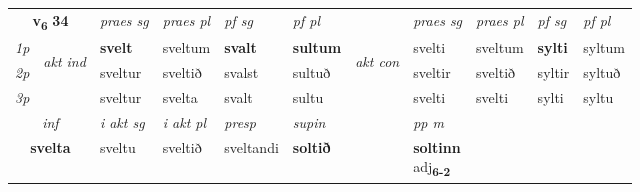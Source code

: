 \noindent
\begin{tabular}{lllllllllll} \toprule
\multicolumn{2}{c}{\textbf{v{\textsubscript{6}}} \Large{\textbf{34}}}  &  \textit{praes sg}  & \textit{praes pl}  &\textit{ pf sg} & \textit{pf pl} &  &  \textit{praes sg}  & \textit{praes pl}  & \textit{pf sg} & \textit{pf pl } \\*
	\cmidrule{3-6} \cmidrule{8-11}
 {\textit{1p}} & \multirow{3}{*}{\begin{turn}{90}\textit{akt ind}\end{turn}} & \textbf{svelt} & sveltum & \textbf{svalt} & \textbf{sultum} & \multirow{3}{*}{\begin{turn}{90}\textit{akt con}\end{turn}} &svelti & sveltum & \textbf{sylti} & syltum\\*
 {\textit{2p}} &  &  sveltur  & sveltið & svalst & sultuð & & sveltir & sveltið & syltir & syltuð \\*
{\textit{3p}} &  & sveltur & svelta & svalt & sultu & & svelti & svelti& sylti & syltu \\*
\cmidrule{3-6} \cmidrule{8-11}

   \multicolumn{2}{c}{\textit{inf}}  & \textit{i akt sg} & \textit{i akt pl}   & \textit{presp} & \textit{supin}  && \textit{pp m} \\*
  \multicolumn{2}{c}{\textbf{svelta}} & sveltu  & sveltið   & sveltandi &  \textbf{soltið}  && \specialcell{\textbf{soltinn} \\ adj\textbf{\textsubscript{6-2}}} \\*
\end{tabular}


